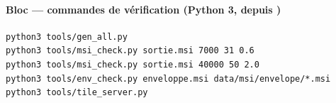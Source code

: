\paragraph*{Bloc  --- commandes de vérification (Python 3, depuis )}\vspace{-2pt}
\begin{Verbatim}[frame=single,framesep=1.5mm,fontsize=\footnotesize,rulecolor=\color{accent}]
python3 tools/gen_all.py
python3 tools/msi_check.py sortie.msi 7000 31 0.6
python3 tools/msi_check.py sortie.msi 40000 50 2.0
python3 tools/env_check.py enveloppe.msi data/msi/envelope/*.msi
python3 tools/tile_server.py
\end{Verbatim}
